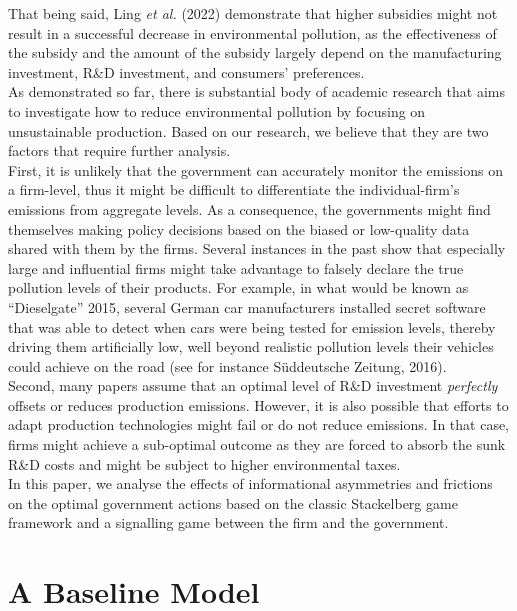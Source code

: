 \documentclass{article}
\begin{document}
That being said, Ling \textit{et al.} (2022) demonstrate that higher subsidies might not result in a successful decrease in environmental pollution, as the effectiveness of the subsidy and the amount of the subsidy largely depend on the manufacturing investment, R\&D investment, and consumers' preferences. \\

As demonstrated so far, there is substantial body of academic research that aims to investigate how to reduce environmental pollution by focusing on unsustainable production. Based on our research, we believe that they are two factors that require further analysis. \\

First, it is unlikely that the government can accurately monitor the emissions on a firm-level, thus it might be difficult to differentiate the individual-firm's emissions from aggregate levels. As a consequence, the governments might find themselves making policy decisions based on the biased or low-quality data shared with them by the firms. Several instances in the past show that especially large and influential firms might take advantage to falsely declare the true pollution levels of their products. For example, in what would be known as “Dieselgate” 2015, several German car manufacturers installed secret software that was able to detect when cars were being tested for emission levels, thereby driving them artificially low, well beyond realistic pollution levels their vehicles could achieve on the road (see for instance Süddeutsche Zeitung, 2016). \\

Second, many papers assume that an optimal level of R\&D investment \textit{perfectly} offsets or reduces production emissions. However, it is also possible that efforts to adapt production technologies might fail or do not reduce emissions. In that case, firms might achieve a sub-optimal outcome as they are forced to absorb the sunk R\&D costs and might be subject to higher environmental taxes.\\

In this paper, we analyse the effects of informational asymmetries and frictions on the optimal government actions based on the classic Stackelberg game framework and a signalling game between the firm and the government. 
\pagebreak
\section{A Baseline Model}
\end{document}

